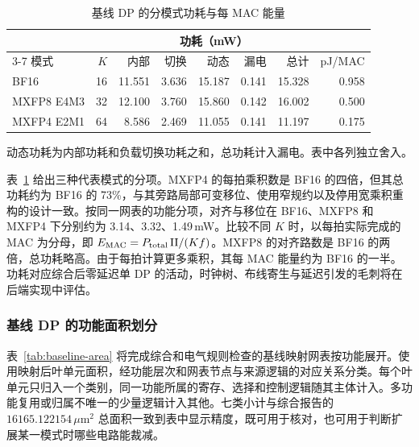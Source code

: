 \documentclass[10.5pt,compsoc,UTF8]{CjC}
\newcommand{\tabnote}[1]{\par\smallskip\begin{minipage}{\linewidth}\zihao{5-}#1\end{minipage}}
\begin{document}
\begin{table}[!htbp]
\centering
\caption{基线 DP 的分模式功耗与每 MAC 能量}
\label{tab:baseline-power}
\setlength{\tabcolsep}{4.5pt}
\begin{tabular}{@{}lrrrrrrr@{}}
\toprule
 & & \multicolumn{5}{c}{功耗（mW）} & \\
\cmidrule(lr){3-7}
模式 & $K$ & 内部 & 切换 & 动态 & 漏电 & 总计 & pJ/MAC \\
\midrule
BF16         & 16 & 11.551 & 3.636 & 15.187 & 0.141 & 15.328 & 0.958 \\
MXFP8 E4M3   & 32 & 12.100 & 3.760 & 15.860 & 0.142 & 16.002 & 0.500 \\
MXFP4 E2M1   & 64 &  8.586 & 2.469 & 11.055 & 0.141 & 11.197 & 0.175 \\
\bottomrule
\end{tabular}
\tabnote{动态功耗为内部功耗和负载切换功耗之和，总功耗计入漏电。表中各列独立舍入。}
\end{table}

表~\ref{tab:baseline-power} 给出三种代表模式的分项。MXFP4 的每拍乘积数是 BF16 的四倍，但其总功耗约为 BF16 的 73\%，与其旁路局部可变移位、使用窄规约以及停用宽乘积重构的设计一致。按同一网表的功能分项，对齐与移位在 BF16、MXFP8 和 MXFP4 下分别约为 3.14、3.32、1.49\,mW。比较不同 $K$ 时，以每拍实际完成的 MAC 为分母，即 $E_{\rm MAC}=P_{\rm total}\,\mathrm{II}/(Kf)$。MXFP8 的对齐路数是 BF16 的两倍，总功耗略高。由于每拍计算更多乘积，其每 MAC 能量约为 BF16 的一半。功耗对应综合后零延迟单 DP 的活动，时钟树、布线寄生与延迟引发的毛刺将在后端实现中评估。

\subsubsection{基线 DP 的功能面积划分}

表~\ref{tab:baseline-area} 将完成综合和电气规则检查的基线映射网表按功能展开。使用映射后叶单元面积，经功能层次和网表节点与来源逻辑的对应关系分类。每个叶单元只归入一个类别，同一功能所属的寄存、选择和控制逻辑随其主体计入。多功能复用或归属不唯一的少量逻辑计入其他。七类小计与综合报告的 $16165.122154\,\mu\mathrm{m}^2$ 总面积一致到表中显示精度，既可用于核对，也可用于判断扩展某一模式时哪些电路能裁减。
\end{document}
